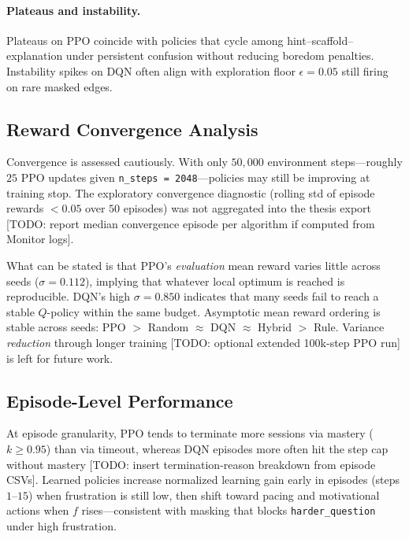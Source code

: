 \paragraph{Plateaus and instability.} Plateaus on PPO coincide with policies that cycle among hint--scaffold--explanation under persistent confusion without reducing boredom penalties. Instability spikes on DQN often align with exploration floor $\epsilon = 0.05$ still firing on rare masked edges.

\subsection{Reward Convergence Analysis}\label{sec:results_adapt_convergence}

Convergence is assessed cautiously. With only $50{,}000$ environment steps---roughly $25$ PPO updates given \texttt{n\_steps = 2048}---policies may still be improving at training stop. The exploratory convergence diagnostic (rolling std of episode rewards $< 0.05$ over $50$ episodes) was not aggregated into the thesis export [TODO: report median convergence episode per algorithm if computed from Monitor logs].

What can be stated is that PPO's \emph{evaluation} mean reward varies little across seeds ($\sigma = 0.112$), implying that whatever local optimum is reached is reproducible. DQN's high $\sigma = 0.850$ indicates that many seeds fail to reach a stable $Q$-policy within the same budget. Asymptotic mean reward ordering is stable across seeds: PPO $>$ Random $\approx$ DQN $\approx$ Hybrid $>$ Rule. Variance \emph{reduction} through longer training [TODO: optional extended 100k-step PPO run] is left for future work.

\subsection{Episode-Level Performance}\label{sec:results_adapt_episode}

At episode granularity, PPO tends to terminate more sessions via mastery ($k \geq 0.95$) than via timeout, whereas DQN episodes more often hit the step cap without mastery [TODO: insert termination-reason breakdown from episode CSVs]. Learned policies increase normalized learning gain early in episodes (steps $1$--$15$) when frustration is still low, then shift toward pacing and motivational actions when $f$ rises---consistent with masking that blocks \texttt{harder\_question} under high frustration.

